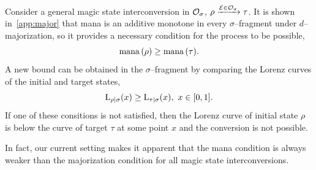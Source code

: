 \documentclass[pra,
aps,
twocolumn,
superscriptaddress,
groupedaddress,
nofootinbib,
reprint
]{revtex4-1}
\begin{document}
Consider a general magic state interconversion in $\mathcal{O}_\sigma$, $\rho \xrightarrow{\mathcal{E} \in \mathcal{O}_\sigma} \tau$.
It is shown in~\cref{app:major} that mana is an additive monotone in every $\sigma$--fragment under $d$--majorization, so it provides a necessary condition for the process to be possible,
\begin{equation}\label{eq:manabound}
    \mana{\rho} \geq \mana{\tau}. %
\end{equation}
A new bound can be obtained in the $\sigma$--fragment by comparing the Lorenz curves of the initial and target states,
\begin{equation}\label{eq:majbound}
    {{\rm{L}}_{\rho|\sigma}}(x) \geq {{\rm{L}}_{\tau|\sigma}}(x),\ x\in [0,1].
\end{equation}
If one of these consitions is not satisfied, then the Lorenz curve of initial state $\rho$ is below the curve of target $\tau$ at some point $x$ and the conversion is not possible.

In fact, our current setting makes it apparent that the mana condition is always weaker than the majorization condition for all magic state interconversions.
\end{document}
